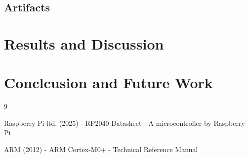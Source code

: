 \documentclass[12pt]{report}
\begin{document}
\pagebreak

\section{Artifacts}


\chapter{Results and Discussion}



\pagebreak

\chapter{Conclcusion and Future Work}



\pagebreak

\begin{thebibliography}{9}

Raspberry Pi ltd\@. (2025) \@- RP2040 Datasheet \@- A microcontroller by Raspberry Pi

ARM (2012) \@- ARM Cortex\@-M0+ \@- Technical Reference Manual
\end{thebibliography}

\end{document}
